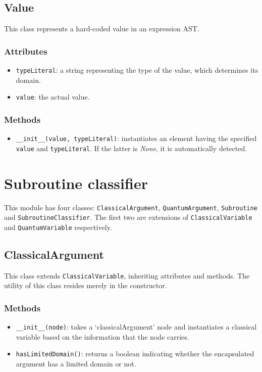 \documentclass[12pt,a4paper]{report}
\theoremstyle{definition}
\theoremstyle{definition}
\theoremstyle{definition}
\begin{document}
\subsection{Value}
This class represents a hard-coded value in an expression AST.
\subsubsection{Attributes}
\begin{itemize}
    \itemsep 0em
    \item \texttt{typeLiteral}: a string representing the type of the value, which determines its domain.
    \item \texttt{value}: the actual value.
\end{itemize}
\subsubsection{Methods}
\begin{itemize}
    \itemsep 0em
    \item \texttt{\_\_init\_\_(value, typeLiteral)}: instantiates an element having the specified \texttt{value} and \texttt{typeLiteral}. If the latter is \textit{None}, it is automatically detected.
\end{itemize}



\section{Subroutine classifier}
This module has four classes: \texttt{ClassicalArgument}, \texttt{QuantumArgument}, \texttt{Subroutine} and \texttt{SubroutineClassifier}. The first two are extensions of \texttt{ClassicalVariable} and \texttt{QuantumVariable} respectively.
\subsection{ClassicalArgument}
This class extends \texttt{ClassicalVariable}, inheriting attributes and methods.
The utility of this class resides merely in the constructor.
\subsubsection{Methods}
\begin{itemize}
    \itemsep 0em
    \item \texttt{\_\_init\_\_(node)}: takes a `classicalArgument' node and instantiates a classical variable based on the information that the node carries.
    \item \texttt{hasLimitedDomain()}: returns a boolean indicating whether the encapsulated argument has a limited domain or not.
\end{itemize}
\end{document}
